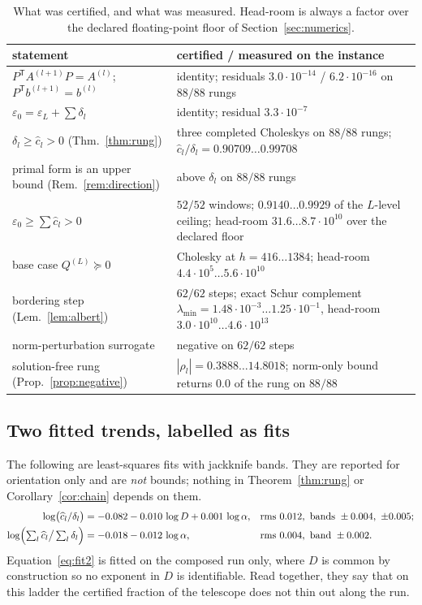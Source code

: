 \documentclass[11pt,a4paper]{article}
\theoremstyle{plain}
\theoremstyle{definition}
\newcommand{\T}{\mathsf{T}}
\newcommand{\lmin}{\lambda_{\min}}
\newcommand{\PSD}{\succeq 0}
\begin{document}
\begin{table}[t]
\centering
\small
\begin{tabularx}{\textwidth}{@{}lY@{}}
\toprule
statement & certified / measured on the instance \\
\midrule
$P^{\T}A^{(l+1)}P=A^{(l)}$; $P^{\T}b^{(l+1)}=b^{(l)}$
  & identity; residuals $3.0\cdot10^{-14}$ / $6.2\cdot10^{-16}$ on $88/88$ rungs \\
$\varepsilon_{0}=\varepsilon_{L}+\sum\delta_{l}$
  & identity; residual $3.3\cdot10^{-7}$ \\
$\delta_{l}\ge\widehat c_{l}>0$ (Thm.~\ref{thm:rung})
  & three completed Choleskys on $88/88$ rungs;
    $\widehat c_{l}/\delta_{l}=0.90709\dots0.99708$ \\
primal form is an upper bound (Rem.~\ref{rem:direction})
  & above $\delta_{l}$ on $88/88$ rungs \\
$\varepsilon_{0}\ge\sum\widehat c_{l}>0$
  & $52/52$ windows; $0.9140\dots0.9929$ of the $L$-level ceiling; head-room
    $31.6\dots8.7\cdot10^{10}$ over the declared floor \\
base case $Q^{(L)}\PSD$
  & Cholesky at $h=416\dots1384$; head-room
    $4.4\cdot10^{5}\dots5.6\cdot10^{10}$ \\
bordering step (Lem.~\ref{lem:albert})
  & $62/62$ steps; exact Schur complement
    $\lmin=1.48\cdot10^{-3}\dots1.25\cdot10^{-1}$, head-room
    $3.0\cdot10^{10}\dots4.6\cdot10^{13}$ \\
norm-perturbation surrogate
  & negative on $62/62$ steps \\
solution-free rung (Prop.~\ref{prop:negative})
  & $|\rho_{l}|=0.3888\dots14.8018$; norm-only bound returns $0.0$ of the rung on
    $88/88$ \\
\bottomrule
\end{tabularx}
\caption{What was certified, and what was measured. Head-room is always a factor over
the declared floating-point floor of Section~\ref{sec:numerics}.}
\label{tab:results}
\end{table}

\subsection{Two fitted trends, labelled as fits}

The following are least-squares fits with jackknife bands. They are reported for
orientation only and are \emph{not} bounds; nothing in
Theorem~\ref{thm:rung} or Corollary~\ref{cor:chain} depends on them.
\begin{align}
\label{eq:fit1}
  \log\bigl(\widehat c_{l}/\delta_{l}\bigr)
  &= -0.082-0.010\,\log D+0.001\,\log\alpha,
  && \text{rms }0.012,\ \text{bands }\pm0.004,\ \pm0.005;\\
\label{eq:fit2}
  \log\Bigl(\textstyle\sum_{l}\widehat c_{l}\big/\sum_{l}\delta_{l}\Bigr)
  &= -0.018-0.012\,\log\alpha,
  && \text{rms }0.004,\ \text{band }\pm0.002 .
\end{align}
Equation~\eqref{eq:fit2} is fitted on the composed run only, where $D$ is common by
construction so no exponent in $D$ is identifiable. Read together, they say that on
this ladder the certified fraction of the telescope does not thin out along the run.
\end{document}
